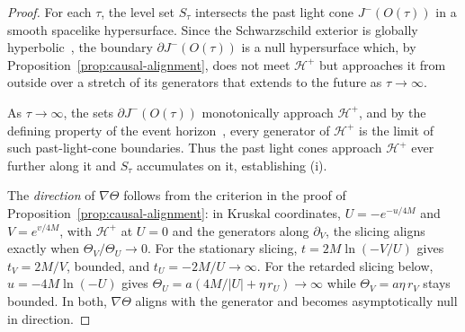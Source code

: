\documentclass[11pt,a4paper]{article}
\theoremstyle{plain}
\theoremstyle{remark}
\begin{document}
\begin{proof}
For each $\tau$, the level set $S_\tau$ intersects the past light cone $J^{-}(O(\tau))$ in a smooth spacelike hypersurface.  
Since the Schwarzschild exterior is globally hyperbolic~\cite{Wald1984}, the boundary $\partial J^{-}(O(\tau))$ is a null hypersurface which, by Proposition~\ref{prop:causal-alignment}, does not meet $\mathcal{H}^+$ but approaches it from outside over a stretch of its generators that extends to the future as $\tau\to\infty$.

As $\tau\to\infty$, the sets $\partial J^{-}(O(\tau))$ monotonically approach $\mathcal{H}^+$, and by the defining property of the event horizon~\cite{hawking1971}, every generator of $\mathcal{H}^+$ is the limit of such past-light-cone boundaries.  
Thus the past light cones approach $\mathcal{H}^+$ ever further along it and $S_\tau$ accumulates on it, establishing (i).

The \emph{direction} of $\nabla\Theta$ follows from the criterion in the proof of Proposition~\ref{prop:causal-alignment}: in Kruskal coordinates, $U=-e^{-u/4M}$ and $V=e^{v/4M}$, with $\mathcal{H}^+$ at $U=0$ and the generators along $\partial_V$, the slicing aligns exactly when $\Theta_V/\Theta_U\to0$. For the stationary slicing, $t=2M\ln(-V/U)$ gives $t_V=2M/V$, bounded, and $t_U=-2M/U\to\infty$. For the retarded slicing below, $u=-4M\ln(-U)$ gives $\Theta_U=a(4M/|U|+\eta\,r_U)\to\infty$ while $\Theta_V=a\eta\,r_V$ stays bounded. In both, $\nabla\Theta$ aligns with the generator and becomes asymptotically null in direction.


\end{proof}
\end{document}
